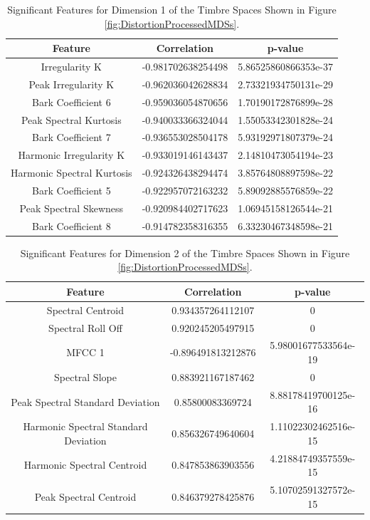 	\begin{table}[h!]
		\centering
		\begin{tabular}{|c|c|c|}
			\hline
			\bf{Feature} & \bf{Correlation} & \bf{p-value} \\
			\hline
			\hline
			Irregularity K & -0.981702638254498 & 5.86525860866353e-37 \\
			\hline
			Peak Irregularity K & -0.962036042628834 & 2.73321934750131e-29 \\
			\hline
			Bark Coefficient 6 & -0.959036054870656 & 1.70190172876899e-28 \\
			\hline
			Peak Spectral Kurtosis & -0.940033366324044 & 1.55053342301828e-24 \\
			\hline
			Bark Coefficient 7 & -0.936553028504178 & 5.93192971807379e-24 \\
			\hline
			Harmonic Irregularity K & -0.933019146143437 & 2.14810473054194e-23 \\
			\hline
			Harmonic Spectral Kurtosis & -0.924326438294474 & 3.85764808897598e-22 \\
			\hline
			Bark Coefficient 5 & -0.922957072163232 & 5.89092885576859e-22 \\
			\hline
			Peak Spectral Skewness & -0.920984402717623 & 1.06945158126544e-21 \\
			\hline
			Bark Coefficient 8 & -0.914782358316355 & 6.33230467348598e-21 \\
			\hline
		\end{tabular}
		\caption{Significant Features for Dimension 1 of the Timbre Spaces Shown in Figure 
			 \ref{fig:DistortionProcessedMDSs}.}
		\label{tab:DistortionProcessedFeaturesDim1}
	\end{table}

	\begin{table}[h!]
		\centering
		\begin{tabular}{|c|c|c|}
			\hline
			\bf{Feature} & \bf{Correlation} & \bf{p-value} \\
			\hline
			\hline
			Spectral Centroid & 0.934357264112107 & 0 \\
			\hline
			Spectral Roll Off & 0.920245205497915 & 0 \\
			\hline
			MFCC 1 & -0.896491813212876 & 5.98001677533564e-19 \\
			\hline
			Spectral Slope & 0.883921167187462 & 0 \\
			\hline
			Peak Spectral Standard Deviation & 0.85800083369724 & 8.88178419700125e-16 \\
			\hline
			Harmonic Spectral Standard Deviation & 0.856326749640604 & 1.11022302462516e-15 \\
			\hline
			Harmonic Spectral Centroid & 0.847853863903556 & 4.21884749357559e-15 \\
			\hline
			Peak Spectral Centroid & 0.846379278425876 & 5.10702591327572e-15 \\
			\hline
		\end{tabular}
		\caption{Significant Features for Dimension 2 of the Timbre Spaces Shown in Figure 
			 \ref{fig:DistortionProcessedMDSs}.}
		\label{tab:DistortionProcessedFeaturesDim2}
	\end{table}

